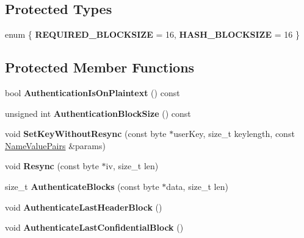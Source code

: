 \subsection*{Protected Types}
\begin{DoxyCompactItemize}
\item 
enum \{ {\bfseries REQUIRED\_\-BLOCKSIZE} =  16, 
{\bfseries HASH\_\-BLOCKSIZE} =  16
 \}
\end{DoxyCompactItemize}
\subsection*{Protected Member Functions}
\begin{DoxyCompactItemize}
\item 
\hypertarget{class_g_c_m___base_ac5890df6512735c99a41642019dfd945}{
bool {\bfseries AuthenticationIsOnPlaintext} () const }
\label{class_g_c_m___base_ac5890df6512735c99a41642019dfd945}

\item 
\hypertarget{class_g_c_m___base_a201e0ae6e7f9ca4f2efa9dc313c3935a}{
unsigned int {\bfseries AuthenticationBlockSize} () const }
\label{class_g_c_m___base_a201e0ae6e7f9ca4f2efa9dc313c3935a}

\item 
\hypertarget{class_g_c_m___base_aeadf6b303db5ab3f298360add6461308}{
void {\bfseries SetKeyWithoutResync} (const byte $\ast$userKey, size\_\-t keylength, const \hyperlink{class_name_value_pairs}{NameValuePairs} \&params)}
\label{class_g_c_m___base_aeadf6b303db5ab3f298360add6461308}

\item 
\hypertarget{class_g_c_m___base_a1143f0296f0ff595dd775e53f823e179}{
void {\bfseries Resync} (const byte $\ast$iv, size\_\-t len)}
\label{class_g_c_m___base_a1143f0296f0ff595dd775e53f823e179}

\item 
\hypertarget{class_g_c_m___base_ae14b00984b6e0dad02fced40c237d536}{
size\_\-t {\bfseries AuthenticateBlocks} (const byte $\ast$data, size\_\-t len)}
\label{class_g_c_m___base_ae14b00984b6e0dad02fced40c237d536}

\item 
\hypertarget{class_g_c_m___base_a5b26945db024d81e115d57729b214f7b}{
void {\bfseries AuthenticateLastHeaderBlock} ()}
\label{class_g_c_m___base_a5b26945db024d81e115d57729b214f7b}

\item 
\hypertarget{class_g_c_m___base_ac5175d69b9b376641626f3f7fa6f0d3e}{
void {\bfseries AuthenticateLastConfidentialBlock} ()}
\label{class_g_c_m___base_ac5175d69b9b376641626f3f7fa6f0d3e}


\end{DoxyCompactItemize}
